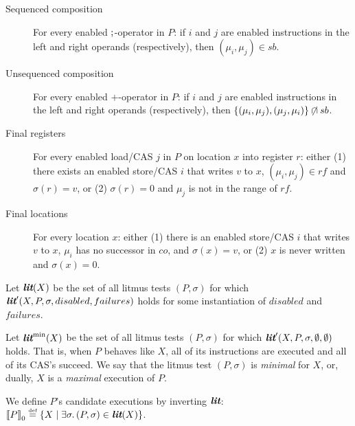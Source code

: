 \begin{definition}
\begin{description}
\item[Sequenced composition] For every enabled $\mathbin{;}$-operator in
$P$: if $i$ and $j$ are enabled instructions in the left and right
operands (respectively), then $(\mu_i,\mu_j)\in {sb}$.

\item[Unsequenced composition] For every enabled $+$-operator in $P$:
if $i$ and $j$ are enabled instructions in the left and right operands
(respectively), then
$\{(\mu_i,\mu_j), (\mu_j,\mu_i)\} \mathbin{\not\hspace{-0.25em}\cap} {sb}$.

\item[Final registers] For every enabled load/CAS $j$ in $P$ on
location $x$ into register $r$: either (1) there exists an enabled
store/CAS $i$ that writes $v$ to $x$, $(\mu_i,\mu_j)\in {rf}$ and
$\sigma(r) = v$, or (2) $\sigma(r) = 0$ and $\mu_j$ is not in the
range of ${rf}$.

\item[Final locations] For every location $x$: either (1) there is an
enabled store/CAS $i$ that writes $v$ to $x$, $\mu_i$ has no
successor in ${co}$, and $\sigma(x) = v$, or (2) $x$ is never written
and $\sigma(x) = 0$.

\end{description}
\end{definition}

\begin{definition}
%
Let $\textbf{\itshape lit}(X)$ be the set of all litmus tests $(P,\sigma)$ for
which $\textbf{\itshape lit}'(X,P,\sigma,disabled,failures)$ holds for some
instantiation of $disabled$ and $failures$.
%
\end{definition}

\begin{definition}
%
Let $\textbf{\itshape lit}^{\rm min}(X)$ be the set of all litmus tests $(P,\sigma)$ for
which $\textbf{\itshape lit}'(X,P,\sigma,\emptyset,\emptyset)$ holds. That is, when
$P$ behaves like $X$, all of its instructions are executed and all of
its CAS's succeed. We say that the litmus test $(P,\sigma)$ is
\emph{minimal} for $X$, or, dually, $X$ is a \emph{maximal}
execution of $P$.
%
\end{definition}

\begin{definition}
\label{def:candidate_executions}
%
We define $P$'s candidate executions by inverting $\textbf{\itshape lit}$:
$\cand{P} \eqdef \{X\mid \exists \sigma\ldotp (P,\sigma)\in\lit(X)\}$.
%
\end{definition}

